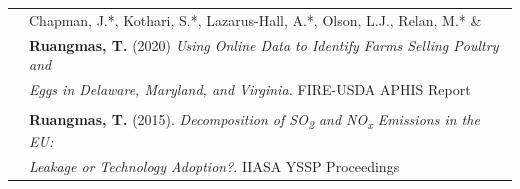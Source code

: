 \documentclass[letterpaper,11pt,oneside]{article}\usepackage[]{graphicx}\usepackage[]{xcolor}
\begin{document}
\begin{tabular}{p{1.2in} l}
                        & Chapman, J.*, Kothari, S.*, Lazarus-Hall, A.*, Olson, L.J., Relan, M.* \& \\
                        & \textbf{Ruangmas, T.} (2020) \textit{Using Online Data to Identify Farms Selling Poultry and} \\
                        & \textit{Eggs in Delaware, Maryland, and Virginia.} FIRE-USDA APHIS Report \href{https://drive.google.com/file/d/1tEazLXx8xA6s9KPVHxVDIlz273T3Oy9N/view?usp=drive_link}{\color{blue}{[Link]}}\\
                        & \\
                        & \textbf{Ruangmas, T.} (2015). \textit{Decomposition of SO\textsubscript{2} and NO\textsubscript{x} Emissions in the EU:}  \\
                        &  \textit{Leakage or Technology Adoption?}. IIASA YSSP Proceedings \\
\end{tabular}
\end{document}
